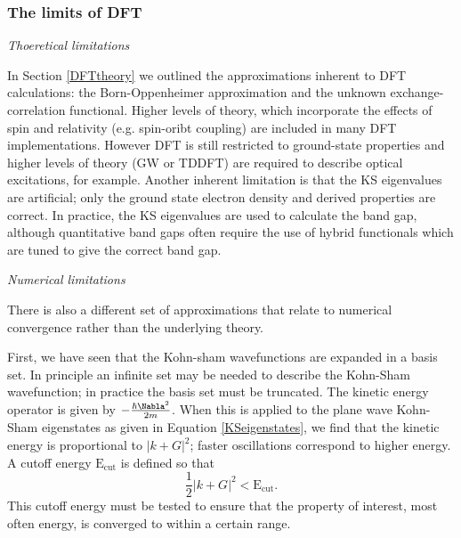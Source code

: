 \subsubsection{The limits of DFT}

\textit{Thoeretical limitations}

In Section \ref{DFTtheory} we outlined the approximations inherent to DFT calculations: the Born-Oppenheimer approximation and the unknown exchange-correlation functional. Higher levels of theory, which incorporate the effects of spin and relativity (e.g. spin-oribt coupling) are included in many DFT implementations. However DFT is still restricted to ground-state properties and higher levels of theory (GW or TDDFT) are required to describe optical excitations, for example. Another inherent limitation is that the KS eigenvalues are artificial; only the ground state electron density and derived properties are correct. In practice, the KS eigenvalues are used to calculate the band gap, although quantitative band gaps often require the use of hybrid functionals which are tuned to give the correct band gap.

\textit{Numerical limitations}

There is also a different set of approximations that relate to  numerical convergence rather than the underlying theory.

First, we have seen that the Kohn-sham wavefunctions are expanded in a basis set. In principle an infinite set may be needed to describe the Kohn-Sham wavefunction; in practice the basis set must be truncated. The kinetic energy operator is given by $-\frac{\hbar \Nabla^2}{2m}$. When this is applied to the plane wave Kohn-Sham eigenstates as given in Equation \ref{KSeigenstates}, we find that the kinetic energy is proportional to $|k+G|^2$; faster oscillations correspond to higher energy. A cutoff energy $\textrm{E}_\textrm{cut}$ is defined so that
\begin{equation}
\frac{1}{2}|k+G|^2 < \textrm{E}_\textrm{cut}.
\end{equation}
This cutoff energy must be tested to ensure that the property of interest, most often energy, is converged to within a certain range.

